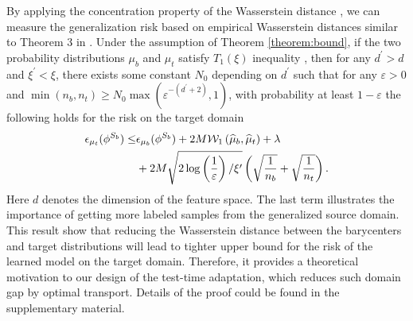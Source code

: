 \documentclass[journal]{IEEEtran}
\begin{document}
By applying the concentration property of the Wasserstein distance \cite{bolley2007quantitative}, we can measure the generalization risk based on empirical Wasserstein distances similar to Theorem 3 in \cite{shen2018wasserstein}. Under the assumption of Theorem \ref{theorem:bound}, if the two probability distributions $\mu_b$ and $\mu_t$ satisfy $T_1(\xi)$ inequality \cite{bolley2007quantitative}, 
then for any $d^\prime > d$ and $\xi^\prime < \xi$, there exists some constant $N_0$ depending on $d^\prime$ such that for any $\varepsilon>0 $ and $\min (n_b, n_t) \geq N_{0} \max \left(\varepsilon^{-\left(d^{\prime}+2\right)}, 1\right)$,
with probability at least $1-\varepsilon$ the following holds for the risk on the target domain
\[
\begin{aligned}
\epsilon_{\mu_t}(\phi^{S_b}) \leq &  \epsilon_{\mu_b}(\phi^{S_b})
  +2M \mathcal{W}_{1}\left(\widehat{\mu}_{b}, \widehat{\mu}_{t}\right)+\lambda\\
  &
  +2 M \sqrt{2 \log \left(\frac{1}{\varepsilon}\right) / \xi^{\prime}}\left(\sqrt{\frac{1}{n_{b}}}+\sqrt{\frac{1}{n_{t}}}\right).\notag
\end{aligned}
\]
Here $d$ denotes the dimension of the feature space. The last term illustrates the importance of getting more labeled samples from the generalized source domain.
This result show that reducing the Wasserstein distance between the barycenters and target distributions will lead to tighter upper bound for the risk of the learned model on the target domain.
Therefore, it provides a theoretical motivation to our design of the test-time adaptation, which reduces such domain gap by optimal transport.
Details of the proof could be found in the supplementary material.
\end{document}
